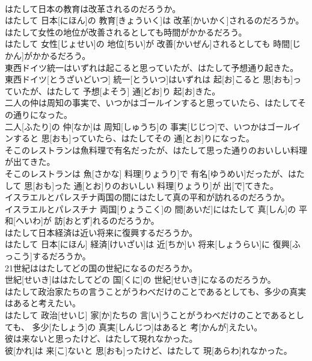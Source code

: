 \documentclass[8pt]{extreport}
\begin{document}
\begin{CJK}{UTF8}{min}
\\	はたして日本の教育は改革されるのだろうか。	
\\	はたして 日本[にほん]の 教育[きょういく]は 改革[かいかく]されるのだろうか。
\\	はたして女性の地位が改善されるとしても時間がかかるだろう。	
\\	はたして 女性[じょせい]の 地位[ちい]が 改善[かいぜん]されるとしても 時間[じかん]がかかるだろう。
\\	東西ドイツ統一はいずれは起こると思っていたが、はたして予想通り起きた。	
\\	東西ドイツ[とうざいどいつ] 統一[とういつ]はいずれは 起[お]こると 思[おも]っていたが、はたして 予想[よそう] 通[どお]り 起[お]きた。
\\	二人の仲は周知の事実で、いつかはゴールインすると思っていたら、はたしてその通りになった。	
\\	二人[ふたり]の 仲[なか]は 周知[しゅうち]の 事実[じじつ]で、いつかはゴールインすると 思[おも]っていたら、はたしてその 通[とお]りになった。
\\	そこのレストランは魚料理で有名だったが、はたして思った通りのおいしい料理が出てきた。	
\\	そこのレストランは 魚[さかな] 料理[りょうり]で 有名[ゆうめい]だったが、はたして 思[おも]った 通[とお]りのおいしい 料理[りょうり]が 出[で]てきた。
\\	イスラエルとパレスチナ両国の間にはたして真の平和が訪れるのだろうか。	
\\	イスラエルとパレスチナ 両国[りょうこく]の 間[あいだ]にはたして 真[しん]の 平和[へいわ]が 訪[おとず]れるのだろうか。
\\	はたして日本経済は近い将来に復興するだろうか。	
\\	はたして 日本[にほん] 経済[けいざい]は 近[ちか]い 将来[しょうらい]に 復興[ふっこう]するだろうか。
\\	21世紀ははたしてどの国の世紀になるのだろうか。	
\\	世紀[せいき]ははたしてどの 国[くに]の 世紀[せいき]になるのだろうか。
\\	はたして政治家たちの言うことがうわべだけのことであるとしても、多少の真実はあると考えたい。	
\\	はたして 政治[せいじ] 家[か]たちの 言[い]うことがうわべだけのことであるとしても、 多少[たしょう]の 真実[しんじつ]はあると 考[かんが]えたい。
\\	彼は来ないと思ったけど、はたして現れなかった。	
\\	彼[かれ]は 来[こ]ないと 思[おも]ったけど、はたして 現[あらわ]れなかった。

\end{CJK}
\end{document}

